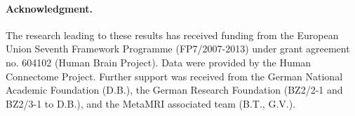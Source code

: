 \documentclass{article} %
\begin{document}
\paragraph{Acknowledgment.}
{\small The research leading to these results has received funding from the
European Union Seventh Framework Programme (FP7/2007-2013)
under grant agreement no. 604102 (Human Brain Project).
Data were provided by the Human Connectome Project.
Further support was received from
the German National Academic Foundation (D.B.),
the German Research Foundation (BZ2/2-1 and BZ2/3-1 to D.B.),
and the MetaMRI associated team (B.T., G.V.).
}

  
\small
% 


\end{document}
